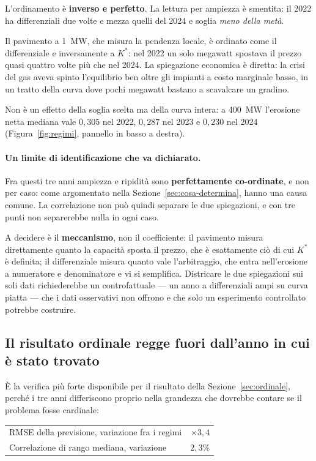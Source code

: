 L'ordinamento \`e \textbf{inverso e perfetto}. La lettura per ampiezza \`e smentita: il 2022
ha differenziali due volte e mezza quelli del 2024 e soglia \emph{meno della met\`a}.

Il pavimento a 1~MW, che misura la pendenza locale, \`e ordinato come il differenziale e
inversamente a $K^*$: nel 2022 un solo megawatt spostava il prezzo quasi quattro volte pi\`u
che nel 2024. La spiegazione economica \`e diretta: la crisi del gas aveva spinto l'equilibrio
ben oltre gli impianti a costo marginale basso, in un tratto della curva dove pochi megawatt
bastano a scavalcare un gradino.

Non \`e un effetto della soglia scelta ma della curva intera: a 400~MW l'erosione netta
mediana vale $0{,}305$ nel 2022, $0{,}287$ nel 2023 e $0{,}230$ nel 2024
(Figura~\ref{fig:regimi}, pannello in basso a destra).

\paragraph{Un limite di identificazione che va dichiarato.} Fra questi tre anni ampiezza e
ripidit\`a sono \textbf{perfettamente co-ordinate}, e non per caso: come argomentato nella
Sezione~\ref{sec:cosa-determina}, hanno una causa comune. La correlazione non pu\`o quindi
separare le due spiegazioni, e con tre punti non separerebbe nulla in ogni caso.

A decidere \`e il \textbf{meccanismo}, non il coefficiente: il pavimento misura direttamente
quanto la capacit\`a sposta il prezzo, che \`e esattamente ci\`o di cui $K^*$ \`e definita; il
differenziale misura quanto vale l'arbitraggio, che entra nell'erosione a numeratore e
denominatore e vi si semplifica. Districare le due spiegazioni sui soli dati richiederebbe un
controfattuale --- un anno a differenziali ampi su curva piatta --- che i dati osservativi non
offrono e che solo un esperimento controllato potrebbe costruire.

\subsection{Il risultato ordinale regge fuori dall'anno in cui \`e stato trovato}

\`E la verifica pi\`u forte disponibile per il risultato della Sezione~\ref{sec:ordinale},
perch\'e i tre anni differiscono proprio nella grandezza che dovrebbe contare se il problema
fosse cardinale:

\begin{center}
\begin{tabular}{@{}lr@{}}
\toprule
\ac{RMSE} della previsione, variazione fra i regimi & $\times 3{,}4$ \\
Correlazione di rango mediana, variazione           & $2{,}3\%$ \\
\bottomrule
\end{tabular}
\end{center}

